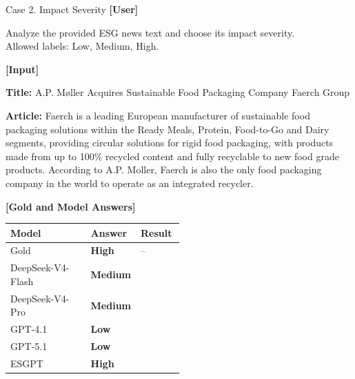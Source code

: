 \documentclass[11pt]{article}
\newcommand{\cmarkblue}{\textcolor{caseblue}{\ding{51}}}
\newcommand{\xmarkred}{\textcolor{casered}{\ding{55}}}
\newcommand{\goldans}[1]{\textbf{#1}}
\newcommand{\correctans}[1]{\textcolor{caseblue}{\textbf{#1}}}
\newcommand{\wrongans}[1]{\textcolor{casered}{\textbf{#1}}}
\begin{document}


\begin{qualcasebox}{Case 2. Impact Severity}
\small
\textbf{[User]}

\footnotesize
Analyze the provided ESG news text and choose its impact severity.\\
Allowed labels: Low, Medium, High.

\vspace{0.6em}
\textbf{[Input]}

\footnotesize
\textbf{Title:} A.P. Møller Acquires Sustainable Food Packaging Company Faerch Group

\vspace{0.3em}
\textbf{Article:} Faerch is a leading European manufacturer of sustainable food packaging solutions within the Ready Meals, Protein, Food-to-Go and Dairy segments, providing circular solutions for rigid food packaging, with products made from up to 100\% recycled content and fully recyclable to new food grade products. According to A.P. Moller, Faerch is also the only food packaging company in the world to operate as an integrated recycler.

\tcblower

\small
\textbf{[Gold and Model Answers]}

\vspace{0.2em}
\footnotesize
\begin{tabularx}{1.0\linewidth}{@{}Y C{0.25\linewidth} C{0.25\linewidth}@{}}
\hline
\textbf{Model} & \textbf{Answer} & \textbf{Result} \\
\hline
Gold & \goldans{High} & -- \\
\hline
DeepSeek-V4-Flash & \wrongans{Medium} & \xmarkred \\
DeepSeek-V4-Pro & \wrongans{Medium} & \xmarkred \\
GPT-4.1 & \wrongans{Low} & \xmarkred \\
GPT-5.1 & \wrongans{Low} & \xmarkred \\
\textsf{ESGPT} & \correctans{High} & \cmarkblue \\
\hline
\end{tabularx}
\end{qualcasebox}
\end{document}
